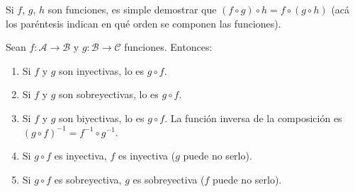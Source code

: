   Si \(f\), \(g\), \(h\) son funciones,
  es simple demostrar que
  \((f \circ g) \circ h = f \circ (g \circ h)\)
  (acá los paréntesis indican en qué orden se componen las funciones).
  \begin{theorem}
    \label{theo:gof}
    Sean \(f \colon \mathcal{A} \rightarrow \mathcal{B}\)
    y \(g \colon \mathcal{B} \rightarrow \mathcal{C}\) funciones.
    Entonces:
    \begin{enumerate}
    \item
      \label{theo:gof:inyectivas}
      Si \(f\) y \(g\) son inyectivas,
      lo es \(g \circ f\).
    \item
      \label{theo:gof:sobreyectivas}
      Si \(f\) y \(g\) son sobreyectivas,
      lo es \(g \circ f\).
    \item
      \label{theo:gof:biyectivas}
      Si \(f\) y \(g\) son biyectivas,
      lo es \(g \circ f\).
      La función inversa de la composición
      es \((g \circ f)^{-1} = f^{-1} \circ g^{-1}\).
    \item
      \label{theo:gof:gof-inyectiva}
      Si \(g \circ f\) es inyectiva,
      \(f\) es inyectiva
      (\(g\) puede no serlo).
    \item
      \label{theo:gof:gof-sobreyectiva}
      Si \(g \circ f\) es sobreyectiva,
      \(g\) es sobreyectiva
      (\(f\) puede no serlo).
    \end{enumerate}
  \end{theorem}
